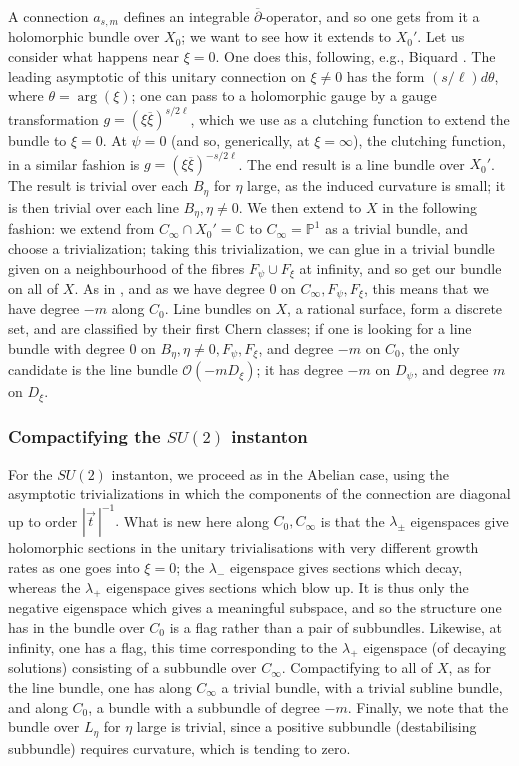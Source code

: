 \documentclass[12pt]{article}
\theoremstyle{definition}
\theoremstyle{remark}
\numberwithin{theorem}{section}
\def\bC{{\mathbb {C}}}
\def\bP{{\mathbb {P}}}
\def\pO{{\mathcal O}}
\begin{document}
A  connection $ a_{s,m} $ defines an  integrable $\overline\partial$-operator, and so one gets from it a  holomorphic bundle over $X_0$; we want to see how it  extends to $X_0'$. Let us consider what happens near $\xi = 0$. One does this, following, e.g., Biquard \cite{Biquard97}. The leading asymptotic of this unitary connection on $\xi\neq 0$ has the form $(s/\ell) d\theta$, where $\theta = \arg(\xi)$; one can pass to a holomorphic gauge by a gauge transformation $g = (\xi\overline\xi)^{s/2\ell}$, which we use as a clutching function to extend the bundle to $\xi = 0$.  At $\psi = 0$ (and so, generically, at $\xi = \infty$), the clutching function, in a similar fashion is $g = (\xi\overline\xi)^{-s/2\ell}$. The end result is a   line bundle over $X_0'$. The result is trivial over each $B_\eta$ for $\eta$ large, as the induced curvature is small; it is  then trivial over each line $B_\eta,\eta\neq 0$.  We then extend to $X$ in the following fashion: we extend from $C_\infty\cap X_0' = \bC $ to $ C_\infty=\bP^1$ as a trivial bundle, and choose a trivialization; taking this trivialization, we can glue in a trivial bundle given on a neighbourhood of the fibres $F_\psi\cup F_\xi$ at infinity, and so get our bundle on all of $X$. As in \cite[Sec.~5]{Cherkis:2016gmo},   and as we have degree 0 on $C_\infty, F_\psi,F_\xi$, this means that we have degree $-m$ along $C_0$.
Line bundles on $X$, a rational surface, form a discrete set, and are classified by their first Chern classes; if one is looking for a line bundle with degree 0 on $B_\eta,\eta\neq 0 , F_\psi, F_\xi$, and degree $-m$ on $C_0$, the only candidate is the line bundle $\pO(-mD_\xi)$; it has degree $ -m$ on $D_\psi$, and degree $ m$ on $D_\xi$.

\subsubsection{Compactifying the $SU(2)$ instanton}

For the $SU(2)$ instanton, we proceed as in the Abelian case, using the asymptotic trivializations in which the  components of the connection are  diagonal up to order $|\vec{t}\,|^{-1}.$  What is new here along $C_0, C_\infty$ is that the $ \lambda_\pm$ eigenspaces give holomorphic sections in the unitary trivialisations with very different growth rates as one goes into $\xi = 0$; the $\lambda_-$ eigenspace gives sections which decay, whereas the $\lambda_+$ eigenspace gives sections which blow up. It is thus only the negative eigenspace  which gives a meaningful subspace, and so the structure one has in the bundle over $C_0$ is a flag rather than a pair of subbundles. Likewise, at infinity, one has a flag, this time corresponding to the $\lambda_+$ eigenspace (of decaying solutions) consisting of a subbundle   over $C_\infty$. Compactifying to all of $X$, as for the line bundle,  one has along $C_\infty$ a trivial bundle, with a trivial subline bundle, and along $C_0$, a bundle with a subbundle of degree $-m$. Finally, we note that the bundle over $L_\eta$ for $\eta$ large is trivial, since a positive subbundle (destabilising subbundle) requires curvature, which is tending to zero.
\end{document}
